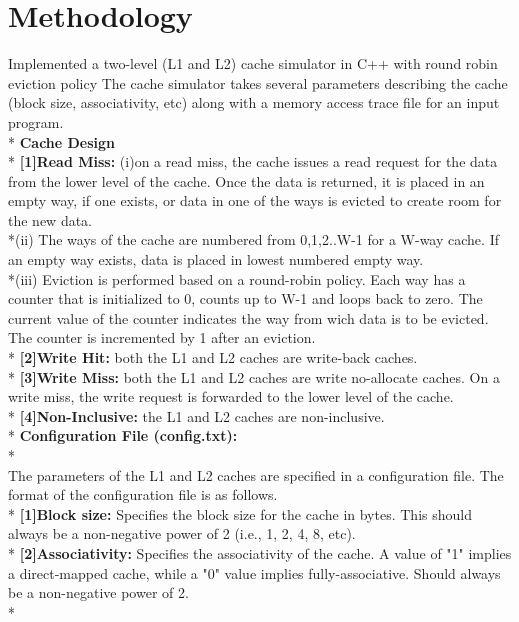\documentclass{article}
\begin{document}
\section{Methodology}
Implemented a two-level (L1 and L2) cache simulator in C++ with round robin eviction policy The cache simulator takes several parameters describing the cache (block size, associativity, etc) along with a memory access trace file for an input program.
\bigskip
\\*
\textbf{Cache Design}
\bigskip
\\*
\textbf{[1]Read Miss:} (i)on a read miss, the cache issues a read request for the data from the lower level of the cache. Once the data is returned, it is placed in an empty way, if one exists, or data in one of the ways is evicted to create room for the new data.
\bigskip
\\*(ii) The ways of the cache are numbered from {0,1,2..W-1} for a W-way cache. If an empty way exists, data is placed in lowest numbered empty way.
\bigskip
\\*(iii) Eviction is performed based on a round-robin policy. Each way has a counter that is initialized to 0, counts up to W-1 and loops back to zero. The current value of the counter indicates the way from wich data is to be evicted. The counter is incremented by 1 after an eviction.
\bigskip
\\*
\textbf{[2]Write Hit:} both the L1 and L2 caches are write-back caches.
\bigskip
\\*
\textbf{[3]Write Miss:} both the L1 and L2 caches are write no-allocate caches. On a write miss, the write request is forwarded to the lower level of the cache.
\bigskip
\\*
\textbf{[4]Non-Inclusive:} the L1 and L2 caches are non-inclusive.
\bigskip
\\*
\textbf{Configuration File (config.txt):}
\\*
\\The parameters of the L1 and L2 caches are specified in a configuration file. The format of the configuration file is as follows.
\bigskip
\\*
\textbf{[1]Block size:} Specifies the block size for the cache in bytes. This should always be a non-negative power of 2 (i.e., 1, 2, 4, 8, etc).
\bigskip
\\*
\textbf{[2]Associativity:} Specifies the associativity of the cache. A value of "1" implies a direct-mapped cache, while a "0" value implies fully-associative. Should always be a non-negative power of 2.
\bigskip
\\*
\end{document}
